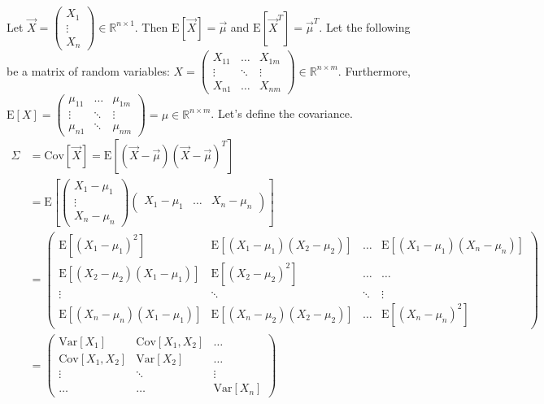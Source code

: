 \documentclass[12pt]{article}
\newcommand{\expected}[1]{\mathrm{E}[#1]}
\newcommand{\variance}[1]{\mathrm{Var}[#1]}
\newcommand{\covariance}[1]{\mathrm{Cov}[#1]}
\begin{document}
Let $\vec{X} = \begin{pmatrix} X_1 \\ \vdots \\ X_n \end{pmatrix} \in \mathbb{R}^{n \times 1}$. Then $\expected{\vec{X}} = \vec{\mu}$ and $\expected{\vec{X}^T} = \vec{\mu}^T$. Let the following be a matrix of random variables: $X = \begin{pmatrix} X_{11} & \dots & X_{1m} \\ \vdots & \ddots & \vdots \\ X_{n1} & \dots & X_{nm} \end{pmatrix} \in \mathbb{R}^{n \times m}$. Furthermore, $\expected{X} = \begin{pmatrix} \mu_{11} & \dots & \mu_{1m} \\ \vdots & \ddots & \vdots \\ \mu_{n1} & \ddots & \mu_{nm} \end{pmatrix} = \mu \in \mathbb{R}^{n \times m}$. Let's define the covariance. $$ \begin{aligned} \Sigma &= \text{Cov}[\vec{X}] = \expected{(\vec{X} - \vec{\mu})(\vec{X} - \vec{\mu})^T} \\ &= \expected{ \begin{pmatrix} X_1 - \mu_1 \\ \vdots \\ X_n - \mu_n \end{pmatrix} \begin{pmatrix} X_1 - \mu_1 & \dots & X_n - \mu_n \end{pmatrix}} \\ &= \begin{pmatrix} \expected{ (X_1 - \mu_1)^2} & \expected{(X_1 - \mu_1)(X_2 - \mu_2)} & \dots & \expected{(X_1 - \mu_1)(X_n - \mu_n)} \\ \expected{(X_2 - \mu_2)(X_1 - \mu_1)} & \expected{(X_2 - \mu_2)^2} & \dots & \dots \\ \vdots & \ddots & \ddots & \vdots \\ \expected{(X_n - \mu_n)(X_1 - \mu_1)} & \expected{(X_n - \mu_2)(X_2 - \mu_2)} & \dots & \expected{(X_n - \mu_n)^2} \end{pmatrix} \\ &= \begin{pmatrix} \variance{X_1} & \covariance{X_1,X_2} & \dots \\ \covariance{X_1,X_2} & \variance{X_2} & \dots \\ \vdots & \ddots & \vdots \\ \dots & \dots & \variance{X_n} \end{pmatrix} \end{aligned} $$ 
\end{document}
